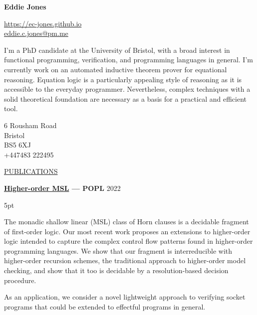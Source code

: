 \documentclass{article}
\newenvironment{tight-list}[1]{
  \vspace{5pt}
  \begin{adjustwidth}{15pt}{0pt}
  \begin{itemize}
    \setlength{\itemsep}{#1}
    \setlength{\parskip}{0pt}
    \setlength{\parsep}{0pt} 
}
{
  \end{itemize}
  \end{adjustwidth}
  \vspace{15pt}
}
\begin{document}
\begin{minipage}[t]{0.7\textwidth}
  \raggedright{}
  {\LARGE\textbf{Eddie Jones}}
  \vspace{10pt}

  \href{https://ec-jones.github.io}{https://ec-jones.github.io}\\
  \href{mailto:eddie.c.jones@pm.me}{eddie.c.jones@pm.me}

  \vspace{15pt}
  I'm a PhD candidate at the University of Bristol, with a broad interest in functional programming, verification, and programming languages in general.
  I'm currently work on an automated inductive theorem prover for equational reasoning.
  Equation logic is a particularly appealing style of reasoning as it is accessible to the everyday programmer.
  Nevertheless, complex techniques with a solid theoretical foundation are necessary as a basis for a practical and efficient tool.
\end{minipage}
\begin{minipage}[t]{0.25\textwidth}
  \raggedleft{}
  \vspace{15pt}
  6 Rousham Road\\
  Bristol\\
  BS5 6XJ\\
  +447483 222495
\end{minipage}

\vspace{20pt}

\uline{{\large PUBLICATIONS}\hfill}

\vspace{10pt}

\textbf{\href{https://arxiv.org/abs/2210.14649}{Higher-order MSL} --- POPL} \hfill 2022
\begin{tight-list}{5pt}
\item The monadic shallow linear (MSL) class of Horn clauses is a decidable fragment of first-order logic. Our most recent work proposes an extensions to higher-order logic intended to capture the complex control flow patterns found in higher-order programming languages. We show that our fragment is interreducible with higher-order recursion schemes, the traditional approach to higher-order model checking, and show that it too is decidable by a resolution-based decision procedure.
\item As an application, we consider a novel lightweight approach to verifying socket programs that could be extended to effectful programs in general. 
\end{tight-list}
\end{document}
